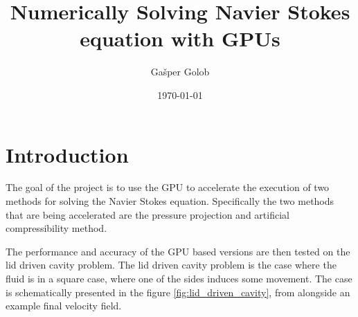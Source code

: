 \documentclass{article}
\title{Numerically Solving Navier Stokes equation with GPUs}
\author{Gašper Golob}
\date{\today}
\begin{document}
\maketitle

\section{Introduction}
The goal of the project is to use the GPU to accelerate the execution of two methods for 
solving the Navier Stokes equation. Specifically the two methods that are being accelerated are
the pressure projection and artificial compressibility method.

The performance and accuracy of the GPU based versions are then tested on the 
lid driven cavity problem. The lid driven cavity problem is the case where the fluid is in 
a square case, where one of the sides induces some movement. 
The case is schematically presented in the figure \ref{fig:lid_driven_cavity}, 
from \cite{lidDriven} alongside an example final velocity field.
\end{document}
